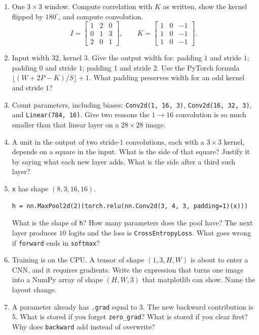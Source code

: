 \documentclass[11pt]{article}
\begin{document}
\begin{enumerate}
\item One $3\times 3$ window. Compute correlation with $K$ as written, show the kernel flipped by $180^\circ$, and compute convolution.
\[
I=\begin{bmatrix} 1&2&0\\ 0&1&3\\ 2&0&1 \end{bmatrix},
\qquad
K=\begin{bmatrix} 1&0&-1\\ 1&0&-1\\ 1&0&-1 \end{bmatrix}.
\]

\item Input width $32$, kernel $3$. Give the output width for: padding $1$ and stride $1$; padding $0$ and stride $1$; padding $1$ and stride $2$. Use the PyTorch formula $\lfloor(W+2P-K)/S\rfloor+1$. What padding preserves width for an odd kernel and stride $1$?

\item Count parameters, including biases: \texttt{Conv2d(1, 16, 3)}, \texttt{Conv2d(16, 32, 3)}, and \texttt{Linear(784, 16)}. Give two reasons the $1\to 16$ convolution is so much smaller than that linear layer on a $28\times 28$ image.

\item A unit in the output of two stride-$1$ convolutions, each with a $3\times 3$ kernel, depends on a square in the input. What is the side of that square? Justify it by saying what each new layer adds. What is the side after a third such layer?

\item \texttt{x} has shape $(8,3,16,16)$.
\begin{verbatim}
h = nn.MaxPool2d(2)(torch.relu(nn.Conv2d(3, 4, 3, padding=1)(x)))
\end{verbatim}
What is the shape of \texttt{h}? How many parameters does the pool have? The next layer produces $10$ logits and the loss is \texttt{CrossEntropyLoss}. What goes wrong if \texttt{forward} ends in \texttt{softmax}?

\item Training is on the CPU. A tensor of shape $(1,3,H,W)$ is about to enter a CNN, and it requires gradients. Write the expression that turns one image into a NumPy array of shape $(H,W,3)$ that matplotlib can show. Name the layout change.

\item A parameter already has \texttt{.grad} equal to $3$. The new backward contribution is $5$. What is stored if you forget \texttt{zero\_grad}? What is stored if you clear first? Why does \texttt{backward} add instead of overwrite?


\end{enumerate}
\end{document}
